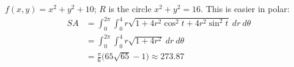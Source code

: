{$f(x,y) = x^2+y^2+10$; $R$ is the circle $x^2+y^2=16$.
}
{This is easier in polar:
\begin{align*}SA &= \int_{0}^{2\pi}\int_{0}^{4} r\sqrt{1+ 4r^2\cos^2t+4r^2\sin^2t}\ dr\ d\theta\\
		&= \int_0^{2\pi}\int_0^4r\sqrt{1+4r^2}\ dr\ d\theta \\
		&= \frac{\pi}{6}\big(65\sqrt{65}-1\big) \approx 273.87
\end{align*}
}
